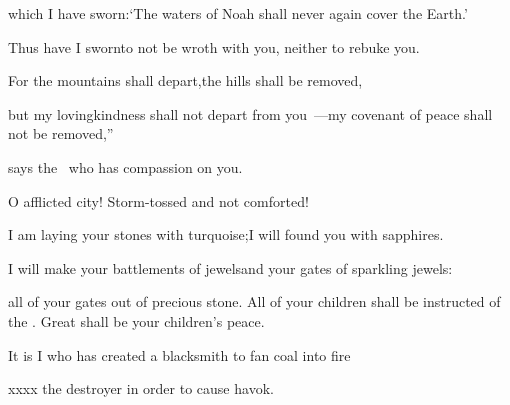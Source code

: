 \begin{inparaenum}
  \pc{}which I have sworn:\pa{}`The waters of Noah shall never again cover the Earth.'%

  \pc{}Thus have I sworn\pa{}to not be wroth with you, neither to rebuke you.%

  \pb{} For the mountains shall depart,\pa{}the hills shall be removed,%

  \pc{}but my lovingkindness shall not depart from you~---\pa{}my covenant of peace shall not be removed,''%

  \pc{}says the \lord\ who has compassion on you.%

  \pa{} O afflicted city! Storm-tossed and not comforted!%

  \pb{}I am laying your stones with turquoise;\pa{}I will found you with sapphires.%

  \pa{} I will make your battlements of jewels\pa{}and your gates of sparkling jewels:%

  \pb{}all of your gates out of precious stone. \pa{} All of your children shall be instructed of the \lord.%
  \pb{}Great shall be your children's peace. \pa{} %

  \pb{}%

  \pa{} %

  \pa{} It is I who has created a blacksmith to fan coal into fire%

  \pb{}xxxx the destroyer in order to cause havok.

  \pa{} %

  \pe{}%

  \pb{}%
\end{inparaenum}
